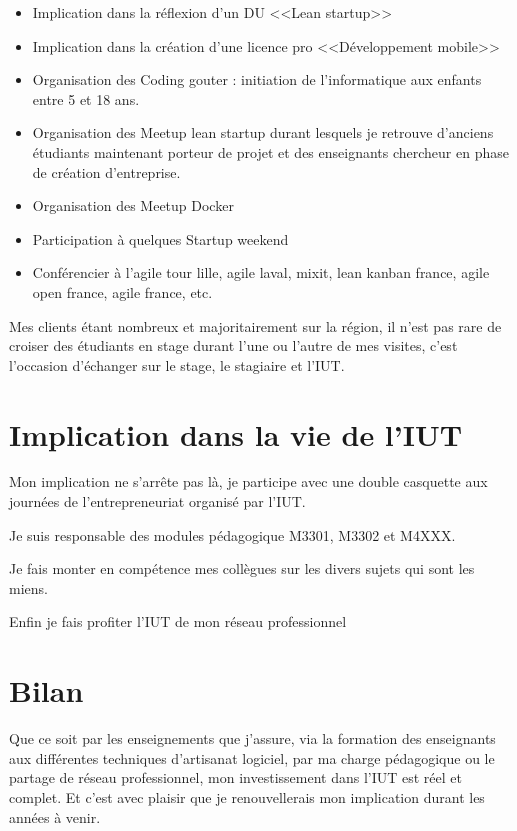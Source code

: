 \documentclass[a4paper]{article}
\begin{document}
\begin{itemize}
  \item Implication dans la réflexion d'un DU <<Lean startup>>
  \item Implication dans la création d'une licence pro <<Développement mobile>> 
  \item Organisation des Coding gouter : initiation de l'informatique aux enfants entre 5 et 18 ans.
  \item Organisation des Meetup lean startup durant lesquels je retrouve d'anciens étudiants maintenant porteur de projet et des enseignants chercheur en phase de création d'entreprise.
  \item Organisation des Meetup Docker
  \item Participation à quelques Startup weekend
  \item Conférencier à l'agile tour lille, agile laval, mixit, lean kanban france, agile open france, agile france, etc.
\end{itemize}

Mes clients étant nombreux et majoritairement sur la région, il n'est pas rare de croiser des étudiants en stage durant l'une ou l'autre de mes visites, c'est l'occasion d'échanger sur le stage, le stagiaire et l'IUT.

\section{Implication dans la vie de l'IUT}

Mon implication ne s'arrête pas là, je participe avec une double casquette aux journées de l'entrepreneuriat organisé par l'IUT.

Je suis responsable des modules pédagogique M3301, M3302 et M4XXX.

Je fais monter en compétence mes collègues sur les divers sujets qui sont les miens.

Enfin je fais profiter l'IUT de mon réseau professionnel 

\section{Bilan}

Que ce soit par les enseignements que j'assure, via la formation des enseignants aux différentes techniques d'artisanat logiciel, par ma charge pédagogique ou le partage de réseau professionnel, mon investissement dans l'IUT est réel et complet. Et c'est avec plaisir que je renouvellerais mon implication durant les années à venir.
\end{document}
